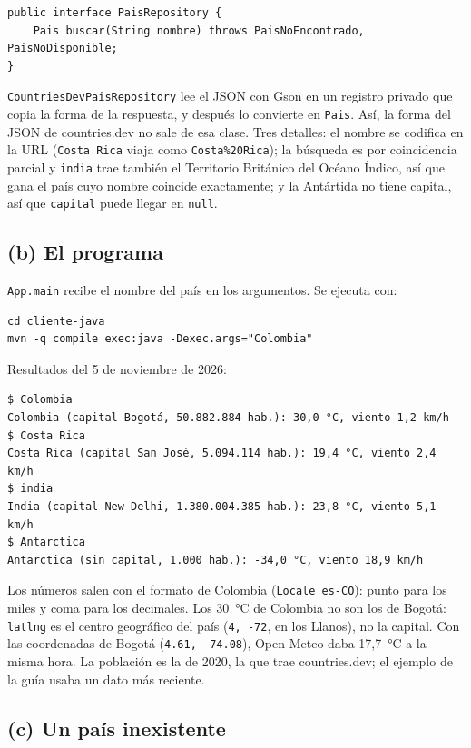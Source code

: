 \documentclass[11pt]{article}
\begin{document}
\begin{lstlisting}
public interface PaisRepository {
    Pais buscar(String nombre) throws PaisNoEncontrado, PaisNoDisponible;
}
\end{lstlisting}

\texttt{CountriesDevPaisRepository} lee el JSON con Gson en un registro privado que copia la forma de la respuesta, y después lo convierte en \texttt{Pais}. Así, la forma del JSON de countries.dev no sale de esa clase. Tres detalles: el nombre se codifica en la URL (\texttt{Costa Rica} viaja como \texttt{Costa\%20Rica}); la búsqueda es por coincidencia parcial y \texttt{india} trae también el Territorio Británico del Océano Índico, así que gana el país cuyo nombre coincide exactamente; y la Antártida no tiene capital, así que \texttt{capital} puede llegar en \texttt{null}.

\subsection*{(b) El programa}

\texttt{App.main} recibe el nombre del país en los argumentos. Se ejecuta con:

\begin{lstlisting}
cd cliente-java
mvn -q compile exec:java -Dexec.args="Colombia"
\end{lstlisting}

Resultados del 5 de noviembre de 2026:

\begin{lstlisting}
$ Colombia
Colombia (capital Bogotá, 50.882.884 hab.): 30,0 °C, viento 1,2 km/h
$ Costa Rica
Costa Rica (capital San José, 5.094.114 hab.): 19,4 °C, viento 2,4 km/h
$ india
India (capital New Delhi, 1.380.004.385 hab.): 23,8 °C, viento 5,1 km/h
$ Antarctica
Antarctica (sin capital, 1.000 hab.): -34,0 °C, viento 18,9 km/h
\end{lstlisting}

Los números salen con el formato de Colombia (\texttt{Locale es-CO}): punto para los miles y coma para los decimales. Los 30~°C de Colombia no son los de Bogotá: \texttt{latlng} es el centro geográfico del país (\texttt{4, -72}, en los Llanos), no la capital. Con las coordenadas de Bogotá (\texttt{4.61, -74.08}), Open-Meteo daba 17,7~°C a la misma hora. La población es la de 2020, la que trae countries.dev; el ejemplo de la guía usaba un dato más reciente.

\subsection*{(c) Un país inexistente}
\end{document}
